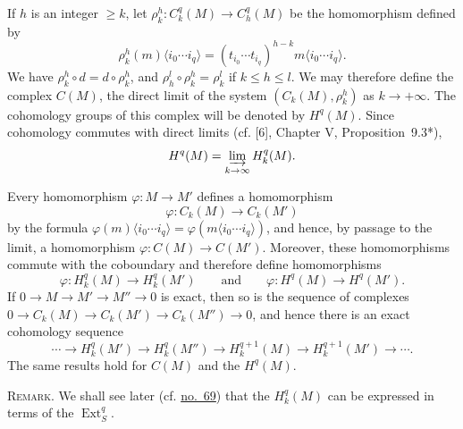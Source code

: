 If $h$ is an integer $\geq k$, let
$\rho^h_k:C^q_k(M)\to C^q_h(M)$ be the homomorphism defined by
\label{fac:III:3:no:61:formula:rho}
\[
\rho^h_k(m)\langle i_0\cdots i_q\rangle
=(t_{i_0}\cdots t_{i_q})^{h-k}
m\langle i_0\cdots i_q\rangle.
\]
We have $\rho^h_k\circ d=d\circ\rho^h_k$, and
$\rho^l_h\circ\rho^h_k=\rho^l_k$ if $k\leq h\leq l$. We may therefore
\label{fac:III:3:no:61:formula:direct-limit-complex}
define the complex $C(M)$, the direct limit of the system
$(C_k(M),\rho^h_k)$ as $k\to+\infty$.
The cohomology groups of this complex will be denoted by $H^q(M)$.
Since cohomology commutes with direct limits (cf. [6], Chapter V,
Proposition~9.3*),
\label{fac:III:3:no:61:formula:direct-limit-cohomology}
\[
H^q(M)=\varinjlim_{k\to\infty}H^q_k(M).
\]

Every homomorphism $\varphi:M\to M'$ defines a homomorphism
\label{fac:III:3:no:61:formula:functorial-chain-map}
\[
\varphi:C_k(M)\longrightarrow C_k(M')
\]
by the formula
$\varphi(m)\langle i_0\cdots i_q\rangle
=\varphi(m\langle i_0\cdots i_q\rangle)$, and hence, by passage to the
limit, a homomorphism $\varphi:C(M)\to C(M')$. Moreover, these
homomorphisms commute with the coboundary and therefore define
homomorphisms
\label{fac:III:3:no:61:formula:functorial-cohomology}
\[
\varphi:H^q_k(M)\longrightarrow H^q_k(M')
\qquad\text{and}\qquad
\varphi:H^q(M)\longrightarrow H^q(M').
\]
If
$0\to M\to M'\to M''\to0$ is exact, then so is the sequence of
complexes
$0\to C_k(M)\to C_k(M')\to C_k(M'')\to0$, and hence there is an exact
cohomology sequence
\label{fac:III:3:no:61:formula:long-exact-sequence}
\[
\cdots\longrightarrow H^q_k(M')\longrightarrow H^q_k(M'')
\longrightarrow H^{q+1}_k(M)\longrightarrow H^{q+1}_k(M')
\longrightarrow\cdots.
\]
The same results hold for $C(M)$ and the $H^q(M)$.

\label{fac:III:3:no:61:remark:no:69}
\textsc{Remark.} We shall see later
(cf. \hyperref[fac:III:4:no:69]{no.~69}) that the $H^q_k(M)$
can be expressed in terms of the $\operatorname{Ext}^q_S$.
